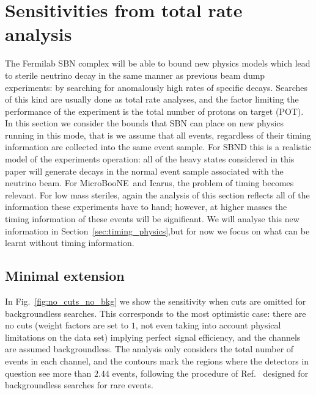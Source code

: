 \documentclass[11pt, a4paper]{article}
\newcommand{\reffig}[1]{Fig.~\ref{#1}}
\newcommand{\refsec}[1]{Section~\ref{#1}}
\newcommand{\refref}[1]{Ref.~\cite{#1}}
\def\muboone{MicroBooNE}
\def\icarus{Icarus}
\begin{document}
\section{Sensitivities from total rate analysis\label{sec:sensitivity}}

The Fermilab SBN complex will be able to bound new physics models which lead to
sterile neutrino decay in the same manner as previous beam dump experiments: by
searching for anomalously high rates of specific decays. Searches of this kind
are usually done as total rate analyses, and the factor limiting the
performance  of the experiment is the total number of protons on target (POT).
In this section we consider the bounds that SBN can place on new physics
running in this mode, that is we assume that all events, regardless of their
timing information are collected into the same event sample. For SBND this is a
realistic model of the experiments operation: all of the heavy states
considered in this paper will generate decays in the normal event sample
associated with the neutrino beam. For \muboone\ and \icarus, the problem of
timing becomes relevant.  For low mass steriles, again the analysis of this
section reflects all of the information these experiments have to hand;
however, at higher masses the timing information of these events will be
significant. We will analyse this new information in
\refsec{sec:timing_physics},but for now we focus on what can be learnt without
timing information.

\subsection{Minimal extension}

In \reffig{fig:no_cuts_no_bkg} we show the sensitivity when cuts are omitted
for backgroundless searches. This corresponds to the most optimistic case:
there are no cuts (weight factors are set to $1$, not even taking into account
physical limitations on the data set) implying perfect signal efficiency, and
the channels are assumed backgroundless.
%
The analysis only considers the total number of events in each channel, and the
contours mark the regions where the detectors in question see more than $2.44$
events, following the procedure of \refref{Feldman:1997qc} designed for
backgroundless searches for rare events. 
\end{document}
